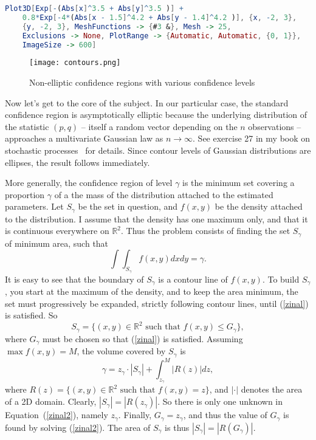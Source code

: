 \documentclass[oneside,10pt]{book}
\begin{document}
\begin{lstlisting}[language=Mathematica]
Plot3D[Exp[-(Abs[x]^3.5 + Abs[y]^3.5 )] + 
    0.8*Exp[-4*(Abs[x - 1.5]^4.2 + Abs[y - 1.4]^4.2 )], {x, -2, 3}, 
    {y, -2, 3}, MeshFunctions -> {#3 &}, Mesh -> 25, 
    Exclusions -> None, PlotRange -> {Automatic, Automatic, {0, 1}}, 
    ImageSize -> 600] 
\end{lstlisting}

\begin{figure}[H]
\centering
\texttt{[image: contours.png]}
\caption{Non-elliptic confidence regions with various confidence levels}
\label{fig:pbcixsds}
\end{figure}

\noindent Now let's get to the core of the subject. In our particular case, the standard confidence region is asymptotically elliptic
 because the underlying distribution of the statistic $(p,q)$ -- itself a random vector depending on the $n$ observations -- approaches a
multivariate Gaussian law as $n\rightarrow\infty$. See exercise 27 in my book on stochastic processes~\cite{vgsimulnew} for details. Since contour levels of Gaussian distributions are ellipses, the result follows immediately. 

More generally, the confidence region of level $\gamma$ is the minimum set covering a proportion $\gamma$ of a the mass of the distribution attached to the estimated parameters. 
Let  $S_\gamma$ be the set in question, and $f(x,y)$ be the density attached to the distribution. I assume 
that the density has one maximum only, and that it is continuous everywhere on $\mathbb{R}^2$. Thus the problem consists of finding 
the set $S_\gamma$ of minimum area, such that
\begin{equation}
\int\int_{S_\gamma} f(x,y) dxdy = \gamma.\label{zinal}
\end{equation}
It is easy to see that the boundary of $S_\gamma$ is a contour line of $f(x,y)$. To build $S_\gamma$, you start at the maximum of the density, and to keep the area minimum, the set must progressively be expanded, strictly following contour lines, until (\ref{zinal}) is satisfied. So 
$$S_\gamma = \{(x, y) \in\mathbb{R}^2 \mbox{ such that } f(x,y)\leq G_\gamma\},$$
where $G_\gamma$ must be chosen so that (\ref{zinal}) is satisfied. Assuming $\max f(x,y)=M$, the volume covered by $S_\gamma$
 is 
\begin{equation}
\gamma = z_\gamma \cdot |S_\gamma| + \int_{z_\gamma}^M |R(z)| dz, \label{zinal2}
\end{equation}
where $R(z) = \{(x, y) \in\mathbb{R}^2 \mbox{ such that } f(x,y) =z\}$, and $|\cdot|$ denotes the area of a 2D domain. Clearly, 
$|S_\gamma|=|R(z_\gamma)|$. So there is only one unknown in Equation~(\ref{zinal2}), namely $z_\gamma$. Finally, $G_\gamma=z_\gamma$, and thus the value of $G_\gamma$ is found by solving (\ref{zinal2}). The area of $S_\gamma$ is
thus $|S_\gamma|=|R(G_\gamma)|$. 
\end{document}
